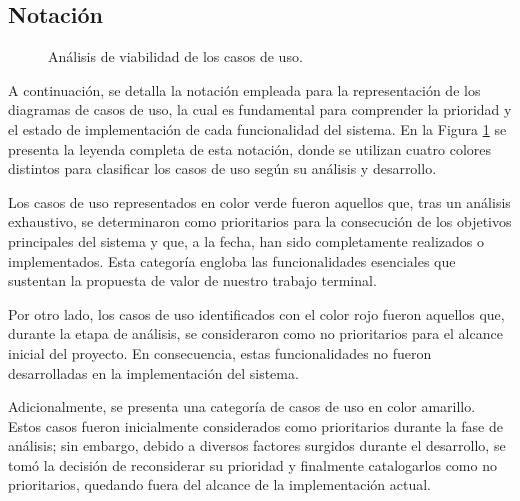 \subsection{Notación}


\begin{figure}[htbp!]
	\begin{center}
		\caption{Análisis de viabilidad de los casos de uso.}
		\label{fig:Notacion}
	\end{center}
\end{figure}

A continuación, se detalla la notación empleada para la representación de los diagramas de casos de uso, la cual es fundamental para comprender la prioridad y el estado de implementación de cada funcionalidad del sistema. En la Figura \ref{fig:Notacion} se presenta la leyenda completa de esta notación, donde se utilizan cuatro colores distintos para clasificar los casos de uso según su análisis y desarrollo.


Los casos de uso representados en color verde fueron aquellos que, tras un análisis exhaustivo, se determinaron como prioritarios para la consecución de los objetivos principales del sistema y que, a la fecha, han sido completamente realizados o implementados. Esta categoría engloba las funcionalidades esenciales que sustentan la propuesta de valor de nuestro trabajo terminal.


Por otro lado, los casos de uso identificados con el color rojo fueron aquellos que, durante la etapa de análisis, se consideraron como no prioritarios para el alcance inicial del proyecto. En consecuencia, estas funcionalidades no fueron desarrolladas en la implementación del sistema.


Adicionalmente, se presenta una categoría de casos de uso en color amarillo. Estos casos fueron inicialmente considerados como prioritarios durante la fase de análisis; sin embargo, debido a diversos factores surgidos durante el desarrollo, se tomó la decisión de reconsiderar su prioridad y finalmente catalogarlos como no prioritarios, quedando fuera del alcance de la implementación actual.


